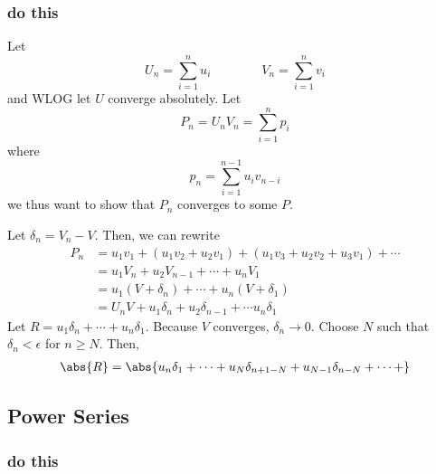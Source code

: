 \subsubsection{}
\subsubsection{}
\subsubsection{}
\subsubsection{do this}
Let 
\[U_n = \sum_{i=1}^n u_i\qquad\qquad V_n = \sum_{i=1}^n v_i\]
and WLOG let \(U\) converge absolutely. 
Let 
\[P_n=U_nV_n=\sum_{i=1}^np_i\]
where
\[p_n = \sum_{i=1}^{n-1} u_i v_{n-i}\]
we thus want to show that \(P_n\) converges to some \(P\).

Let \(\delta_n = V_n-V\). Then, we can rewrite
\begin{align*}
	P_n &= u_1v_1 + (u_1v_2 + u_2v_1) + (u_1v_3+u_2v_2+u_3v_1)+\cdots\\
	&= u_1 V_n + u_2 V_{n-1} + \cdots+ u_n V_1\\
	&=u_1(V+\delta_n)+\cdots + u_n (V+\delta_1)\\
	&= U_nV + u_1\delta_n + u_2\delta_{n-1}+\cdots u_n\delta_1
\end{align*}
Let \(R = u_1\delta_n + \cdots + u_n \delta_1\). Because \(V\) converges, \(\delta_n\to 0\). Choose \(N\) such that \(\delta_{n}<\epsilon\) for \(n\geq N\). Then, 
\begin{align*}
	\abs{R} = \abs{u_n\delta_1+\cdots+u_N\delta_{n+1-N}+u_{N-1}\delta_{n-N}+\cdots+}
\end{align*}


\subsection{Power Series}
\subsubsection{}
\subsubsection{}
\subsubsection{do this}
